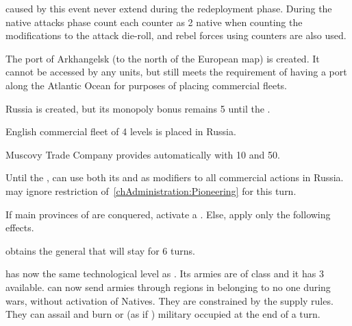 \phinter
\aparag \REVOLT caused by this event never extend during the redeployment
phase.
\aparag During the native attacks phase count each \REVOLT \facemoins counter
as 2 native \DT when counting the modifications to the attack die-roll, and
rebel forces using \payssiberie counters are also used.






\phevnt

\aparag The port of Arkhangelsk (to the north of the European map) is created.
It cannot be accessed by any units, but still meets the requirement of having
a port along the Atlantic Ocean for purposes of placing commercial fleets.

\aparag \CTZ Russia is created, but its monopoly bonus remains 5 until the
.

\aparag English commercial fleet of 4 levels is placed in \CTZ Russia.

\aparag Muscovy Trade Company provides \ENG automatically with 10 \VP and
50\ducats.

\phadm

\aparag Until the , \ENG can use both
its \DTI and \FTI as modifiers to all commercial actions in \CTZ Russia.
\aparag \RUS may ignore restriction of~\ref{chAdministration:Pioneering} for
this turn.





\phevnt

\condition{}
\aparag If main provinces of \paysperse are conquered, activate a
.
\aparag Else, apply only the following effects.

\phevnt
\aparag \paysperse obtains the general  that will stay for
6 turns.

\effetlong
\aparag \paysperse has now the same technological level as \TUR.  Its armies
are of class \CAI and it has 3 \ARMY available.
\aparag \paysperse can now send armies through regions in \ROTW belonging to
no one during wars, without activation of Natives. They are constrained by the
supply rules. They can assail and burn \TP or \COL (as if \TP) military
occupied at the end of a turn.



